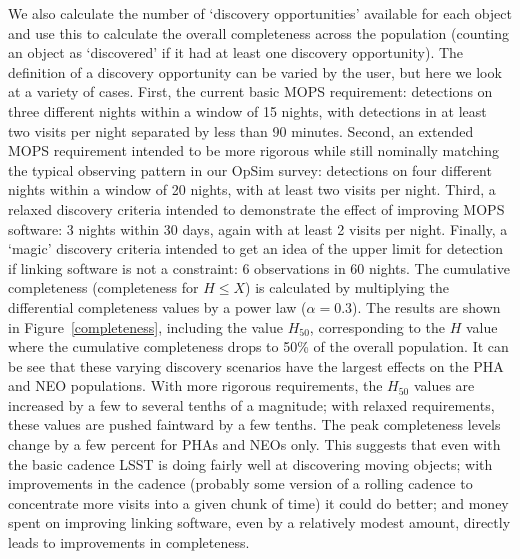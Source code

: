 \documentclass{iau}
\begin{document}
We also calculate the number of `discovery opportunities' available
for each object and use this to calculate the overall completeness
across the population (counting an object as `discovered' if it had at
least one discovery opportunity). The definition of a discovery
opportunity can be varied by the user, but here we look at a variety
of cases. First, the current basic MOPS requirement: detections on
three different nights within a window of 15 nights, with detections
in at least two visits per night separated by less than 90
minutes. Second, an extended MOPS requirement intended to be more
rigorous while still nominally matching the typical observing pattern
in our OpSim survey: detections on four different nights within a
window of 20 nights, with at least two visits per night. Third, a
relaxed discovery criteria intended to demonstrate the effect of
improving MOPS software: 3 nights within 30 days, again with at least
2 visits per night. Finally, a `magic' discovery criteria intended to
get an idea of the upper limit for detection if linking software is
not a constraint: 6 observations in 60 nights. The cumulative
completeness (completeness for $H \le X$) is calculated by multiplying
the differential completeness values by a power law
($\alpha=0.3$). The results are shown in Figure~\ref{completeness},
including the value $H_{50}$, corresponding to the $H$ value where the
cumulative completeness drops to 50\% of the overall population. It
can be see that these varying discovery scenarios have the largest
effects on the PHA and NEO populations. With more rigorous
requirements, the $H_{50}$ values are increased by a few to several
tenths of a magnitude; with relaxed requirements, these values are
pushed faintward by a few tenths. The peak completeness levels change
by a few percent for PHAs and NEOs only. This suggests that even with
the basic cadence LSST is doing fairly well at discovering moving
objects; with improvements in the cadence (probably some version of a
rolling cadence to concentrate more visits into a given chunk of time)
it could do better; and money spent on improving linking software,
even by a relatively modest amount, directly leads to improvements in
completeness.
\end{document}
